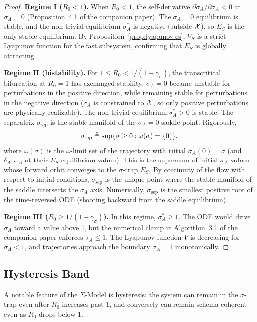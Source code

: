 \begin{proof}
\textbf{Regime I ($R_0 < 1$).} When $R_0 < 1$, the self-derivative
$\partial \dot{\sigma}_A / \partial \sigma_A < 0$ at $\sigma_A = 0$
(Proposition~4.1 of the companion paper). The $\sigma_A = 0$ equilibrium
is stable, and the non-trivial equilibrium $\sigma^*_A$ is negative
(outside $\mathcal{X}$), so $E_S$ is the only stable equilibrium. By
Proposition~\ref{prop:lyapunov-es}, $V_S$ is a strict Lyapunov function
for the fast subsystem, confirming that $E_S$ is globally attracting.

\textbf{Regime II (bistability).} For $1 \leq R_0 < 1/(1 - \gamma_\sigma)$,
the transcritical bifurcation at $R_0 = 1$ has exchanged stability:
$\sigma_A = 0$ became unstable for perturbations in the positive direction,
while remaining stable for perturbations in the negative direction
($\sigma_A$ is constrained to $\mathcal{X}$, so only positive perturbations are
physically realizable). The non-trivial equilibrium $\sigma^*_A > 0$ is
stable. The separatrix $\sigma_{\mathrm{sep}}$ is the stable manifold of
the $\sigma_A = 0$ saddle point. Rigorously,
\[
\sigma_{\mathrm{sep}} \triangleq \sup\{ \sigma \geq 0 : \omega(\sigma) = \{0\} \},
\]
where $\omega(\sigma)$ is the $\omega$-limit set of the trajectory with
initial $\sigma_A(0) = \sigma$ (and $\delta_A, \alpha_A$ at their
$E_S$ equilibrium values). This is the supremum of initial $\sigma_A$
values whose forward orbit converges to the $\sigma$-trap $E_S$.
By continuity of the flow with respect to initial conditions,
$\sigma_{\mathrm{sep}}$ is the unique point where the stable manifold
of the saddle intersects the $\sigma_A$ axis. Numerically,
$\sigma_{\mathrm{sep}}$ is the smallest positive root of the
time-reversed ODE (shooting backward from the saddle equilibrium).

\textbf{Regime III ($R_0 \geq 1/(1 - \gamma_\sigma)$).} In this regime,
$\sigma^*_A \geq 1$. The ODE would drive $\sigma_A$ toward a value
above 1, but the numerical clamp in Algorithm~3.1 of the companion paper
enforces $\sigma_A \leq 1$. The Lyapunov function $V$ is decreasing for
$\sigma_A < 1$, and trajectories approach the boundary $\sigma_A = 1$
monotonically.
\end{proof}

\subsection{Hysteresis Band}

A notable feature of the $\Sigma$-Model is hysteresis: the system can
remain in the $\sigma$-trap even after $R_0$ increases past 1, and
conversely can remain schema-coherent even as $R_0$ drops below 1.

